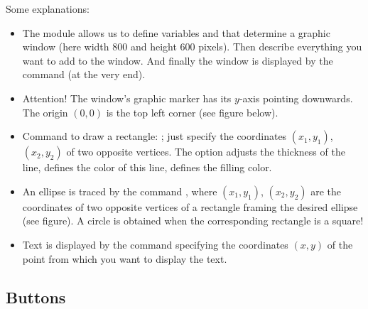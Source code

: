 \documentclass[11pt,class=report,crop=false]{standalone}
\begin{document}
Some explanations:
\begin{itemize}
  \item The  module allows us to define variables  and  that determine a graphic window (here width $800$ and height $600$ pixels).
  Then describe everything you want to add to the window. And finally the window is displayed by the command  (at the very end). 
  
    
  \item Attention! The window's graphic marker has its $y$-axis pointing downwards. The origin $(0,0)$ is the top left corner (see figure below). 
  
  \item Command to draw a rectangle: ; just specify the coordinates $(x_1,y_1)$, $(x_2,y_2)$ of two opposite vertices. The option  adjusts the thickness of the line,  defines the color of this line,  defines the filling color.
  
  \item An ellipse is traced by the command , where $(x_1,y_1)$, $(x_2,y_2)$ are the coordinates of two opposite vertices of a rectangle framing the desired ellipse (see figure). A circle is obtained when the corresponding rectangle is a square!  
  
  \item Text is displayed by the command  specifying the coordinates $(x,y)$ of the point from which you want to display the text. 
  
\end{itemize}




\subsection{Buttons}
\end{document}
